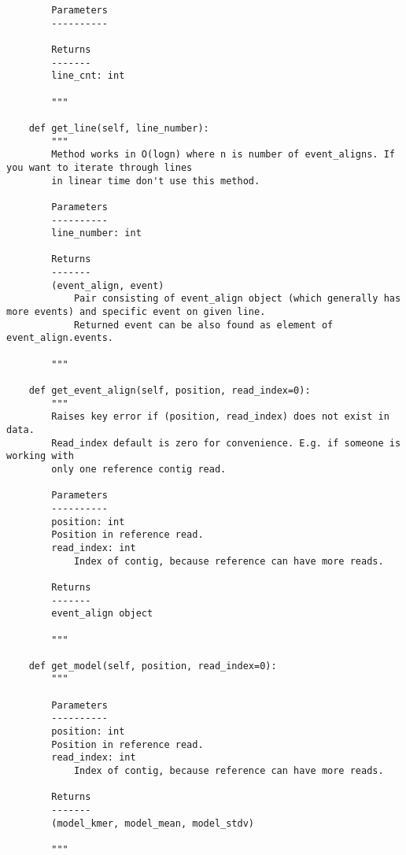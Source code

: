 \documentclass[]{article}
\begin{document}
\begin{lstlisting}
		Parameters
		----------
		
		Returns
		-------
		line_cnt: int
		
		"""
	
	def get_line(self, line_number):
		"""
		Method works in O(logn) where n is number of event_aligns. If you want to iterate through lines
		in linear time don't use this method. 
		
		Parameters
		----------
		line_number: int
		
		Returns
		-------
		(event_align, event)
			Pair consisting of event_align object (which generally has more events) and specific event on given line.
			Returned event can be also found as element of event_align.events.
		
		"""
	
	def get_event_align(self, position, read_index=0):
		"""
		Raises key error if (position, read_index) does not exist in data.  
		Read_index default is zero for convenience. E.g. if someone is working with
		only one reference contig read.
		
		Parameters
		----------
		position: int
		Position in reference read. 
		read_index: int
			Index of contig, because reference can have more reads.
		
		Returns
		-------
		event_align object
		
		"""
	
	def get_model(self, position, read_index=0):
		"""
		
		Parameters
		----------
		position: int
		Position in reference read.
		read_index: int
			Index of contig, because reference can have more reads. 
		
		Returns
		-------
		(model_kmer, model_mean, model_stdv)
		
		"""
\end{lstlisting}
\end{document}
